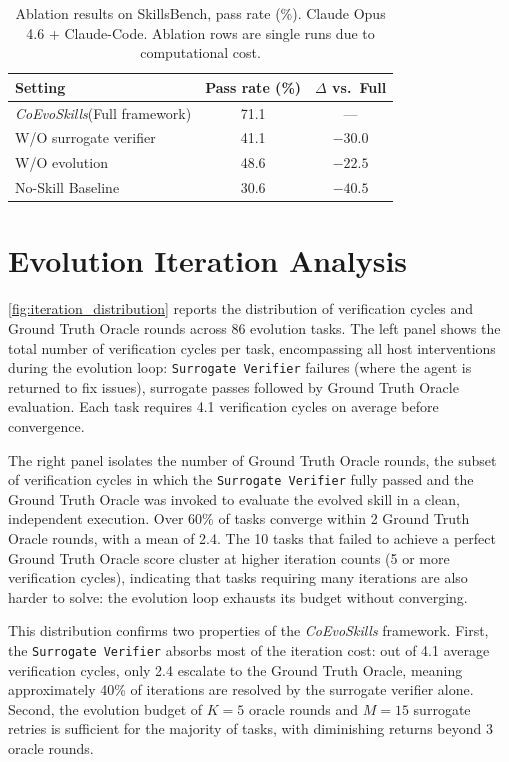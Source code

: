 \documentclass{article}
\newcommand{\method}{\textit{CoEvoSkills}\xspace}
\newcommand{\bench}{SkillsBench\xspace}
\begin{document}
\begin{table}[ht!]
\centering
\small
\caption{Ablation results on \bench, pass rate (\%). Claude Opus 4.6 + Claude-Code. Ablation rows are single runs due to computational cost.}
\label{tab:ablation}
\begin{tabular}{@{}lcc@{}}
\toprule
\textbf{Setting} & \textbf{Pass rate (\%)} & \textbf{$\Delta$ vs.\ Full} \\
\midrule
\method (Full framework) & 71.1 & --- \\
W/O surrogate verifier & 41.1 & $-30.0$ \\
W/O evolution & 48.6 & $-22.5$ \\
No-Skill Baseline & 30.6 & $-40.5$ \\
\bottomrule
\end{tabular}
\end{table}


\section{Evolution Iteration Analysis}
\label{app:iteration}

\autoref{fig:iteration_distribution} reports the distribution of verification cycles and Ground Truth Oracle rounds across 86 evolution tasks.
The left panel shows the total number of verification cycles per task, encompassing all host interventions during the evolution loop: \texttt{Surrogate Verifier} failures (where the agent is returned to fix issues), surrogate passes followed by Ground Truth Oracle evaluation. Each task requires 4.1 verification cycles on average before convergence.

The right panel isolates the number of Ground Truth Oracle rounds, the subset of verification cycles in which the \texttt{Surrogate Verifier} fully passed and the Ground Truth Oracle was invoked to evaluate the evolved skill in a clean, independent execution. Over 60\% of tasks converge within 2 Ground Truth Oracle rounds, with a mean of 2.4. The 10 tasks that failed to achieve a perfect Ground Truth Oracle score cluster at higher iteration counts (5 or more verification cycles), indicating that tasks requiring many iterations are also harder to solve: the evolution loop exhausts its budget without converging.

This distribution confirms two properties of the \method framework. First, the \texttt{Surrogate Verifier} absorbs most of the iteration cost: out of 4.1 average verification cycles, only 2.4 escalate to the Ground Truth Oracle, meaning approximately 40\% of iterations are resolved by the surrogate verifier alone. Second, the evolution budget of $K{=}5$ oracle rounds and $M{=}15$ surrogate retries is sufficient for the majority of tasks, with diminishing returns beyond 3 oracle rounds.
\end{document}
